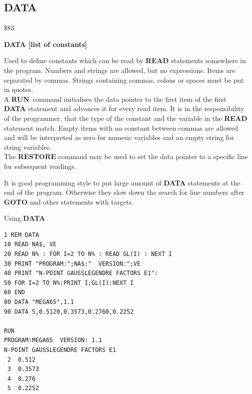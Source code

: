 
\newpage
\subsection{DATA}
\begin{description}[leftmargin=2cm,style=nextline]
\item [Token:] \$83
\item [Format:] {\bf DATA [list of constants]}
\item [Usage:] Used to define constants
               which can be read by {\bf READ} statements somewhere
               in the program. Numbers and strings are allowed, but no expressions.
               Items are separated by commas.
               Strings containing commas, colons or spaces must be put
               in quotes. \\
               A {\bf RUN} command initialises the data pointer
               to the first item of the first {\bf DATA} statement
               and advances it for every read item. It is in the
               responsibility of the programmer, that the type of
               the constant and the variable in the {\bf READ}
               statement match. Empty items with no constant
               between commas are allowed and will be interpreted as
               zero for numeric variables and an empty string for
               string variables. \\
               The {\bf RESTORE} command may be used to set the
               data pointer to a specific line for subsequent
               readings.

\item [Remarks:] It is good programming style to put large amount of
               {\bf DATA} statements at the end of the program.
               Otherwise they slow down the search for line numbers
               after {\bf GOTO} and other statements with targets.
\item [Example:] Using {\bf DATA}
\begin{tcolorbox}[colback=black,coltext=white]
\verbatimfont{\codefont}
\begin{verbatim}
1 REM DATA
10 READ NA$, VE
20 READ N% : FOR I=2 TO N% : READ GL(I) : NEXT I
30 PRINT "PROGRAM:";NA$;"  VERSION:";VE
40 PRINT "N-POINT GAUSSLEGENDRE FACTORS E1":
50 FOR I=2 TO N%:PRINT I;GL(I):NEXT I
60 END
80 DATA "MEGA65",1.1
90 DATA 5,0.5120,0.3573,0.2760,0.2252

RUN
PROGRAM:MEGA65  VERSION: 1.1
N-POINT GAUSSLEGENDRE FACTORS E1
 2  0.512
 3  0.3573
 4  0.276
 5  0.2252
\end{verbatim}
\end{tcolorbox}
\end{description}

